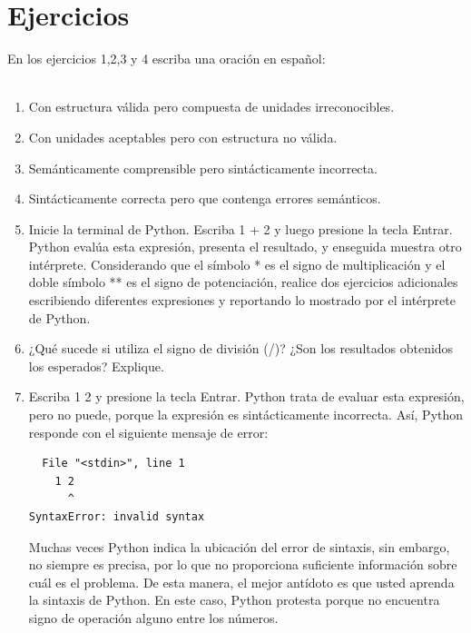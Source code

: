 \section{Ejercicios}


En los ejercicios 1,2,3 y 4 escriba una oración en español:\\ \\

\begin{enumerate}


\item Con estructura válida pero compuesta de unidades irreconocibles.

\item Con unidades aceptables pero con estructura no válida.

\item Semánticamente comprensible pero sintácticamente incorrecta. 

\item Sintácticamente correcta pero que contenga errores semánticos.

\item Inicie la terminal de Python. Escriba 1 + 2 y luego presione la tecla Entrar. 
Python evalúa esta expresión, presenta el resultado, y enseguida muestra otro intérprete. 
Considerando que el símbolo * es el signo de multiplicación y el doble símbolo ** es el 
signo de potenciación, realice dos ejercicios adicionales escribiendo diferentes expresiones 
y reportando lo mostrado por el intérprete de Python. 

\item ¿Qué sucede si utiliza el signo de división (/)? 
¿Son los resultados obtenidos los esperados? Explique.

\item Escriba 1 2 y presione la tecla Entrar. Python trata de evaluar esta expresión, 
pero no puede, porque la expresión es sintácticamente incorrecta. Así, Python responde 
con el siguiente mensaje de error:

\begin{verbatim}
  File "<stdin>", line 1
    1 2
      ^
SyntaxError: invalid syntax
\end{verbatim}

Muchas veces Python indica la ubicación del error de sintaxis, sin embargo, no siempre es 
precisa, por lo que no proporciona suficiente información sobre cuál es el problema. De 
esta manera, el mejor antídoto es que usted aprenda la sintaxis de Python. En este caso, 
Python protesta porque no encuentra signo de operación alguno entre los 
números.


\end{enumerate}
